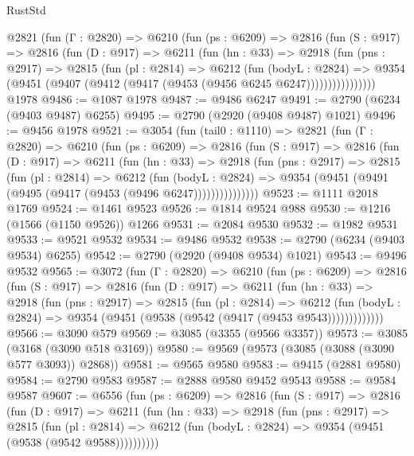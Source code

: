 \begin{lexlean}{RustStd}
\begin{coremodule}
      @2821
        (fun (Γ : @2820) =>
        @6210
          (fun (ps : @6209) =>
          @2816
            (fun (S : @917) =>
            @2816
              (fun (D : @917) =>
              @6211
                (fun (hn : @33) =>
                @2918
                  (fun (pns : @2917) =>
                  @2815
                    (fun (pl : @2814) =>
                    @6212
                      (fun (bodyL : @2824) =>
                      @9354 (@9451 (@9407 (@9412 (@9417 (@9453 (@9456 @6245 @6247))))))))))))))))
    @1978
@9486 := @1087 @1978
@9487 := @9486 @6247
@9491 := @2790 (@6234 (@9403 @9487) @6255)
@9495 := @2790 (@2920 (@9408 @9487) @1021)
@9496 := @9456 @1978
@9521 := @3054
    (fun (tail0 : @1110) =>
    @2821
      (fun (Γ : @2820) =>
      @6210
        (fun (ps : @6209) =>
        @2816
          (fun (S : @917) =>
          @2816
            (fun (D : @917) =>
            @6211
              (fun (hn : @33) =>
              @2918
                (fun (pns : @2917) =>
                @2815
                  (fun (pl : @2814) =>
                  @6212
                    (fun (bodyL : @2824) =>
                    @9354 (@9451 (@9491 (@9495 (@9417 (@9453 (@9496 @6247)))))))))))))))
@9523 := @1111 @2018 @1769
@9524 := @1461 @9523
@9526 := @1814 @9524 @988
@9530 := @1216 (@1566 (@1150 @9526)) @1266
@9531 := @2084 @9530
@9532 := @1982 @9531
@9533 := @9521 @9532
@9534 := @9486 @9532
@9538 := @2790 (@6234 (@9403 @9534) @6255)
@9542 := @2790 (@2920 (@9408 @9534) @1021)
@9543 := @9496 @9532
@9565 := @3072
    (fun (Γ : @2820) =>
    @6210
      (fun (ps : @6209) =>
      @2816
        (fun (S : @917) =>
        @2816
          (fun (D : @917) =>
          @6211
            (fun (hn : @33) =>
            @2918
              (fun (pns : @2917) =>
              @2815
                (fun (pl : @2814) =>
                @6212
                  (fun (bodyL : @2824) =>
                  @9354 (@9451 (@9538 (@9542 (@9417 (@9453 @9543)))))))))))))
@9566 := @3090 @579
@9569 := @3085 (@3355 (@9566 @3357))
@9573 := @3085 (@3168 (@3090 @518 @3169))
@9580 := @9569 (@9573 (@3085 (@3088 (@3090 @577 @3093)) @2868))
@9581 := @9565 @9580
@9583 := @9415 (@2881 @9580)
@9584 := @2790 @9583
@9587 := @2888 @9580 @9452 @9543
@9588 := @9584 @9587
@9607 := @6556
    (fun (ps : @6209) =>
    @2816
      (fun (S : @917) =>
      @2816
        (fun (D : @917) =>
        @6211
          (fun (hn : @33) =>
          @2918
            (fun (pns : @2917) =>
            @2815
              (fun (pl : @2814) =>
              @6212 (fun (bodyL : @2824) => @9354 (@9451 (@9538 (@9542 @9588))))))))))

\end{coremodule}
\end{lexlean}
